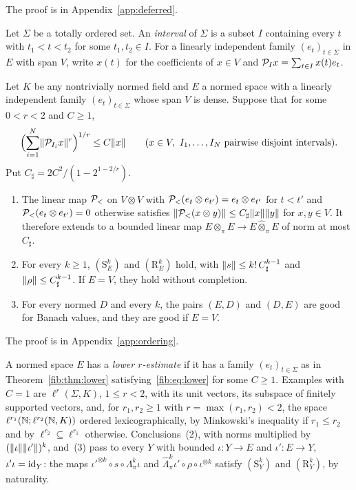 The proof is in Appendix~\ref{app:deferred}.

Let $\Sigma$ be a totally ordered set. An \emph{interval} of $\Sigma$ is a subset $I$ containing every $t$ with
$t_1<t<t_2$ for some $t_1,t_2\in I$. For a linearly independent family $(e_t)_{t\in\Sigma}$ in $E$ with span $V$, write
$x(t)$ for the coefficients of $x\in V$ and $\mathcal P_Ix=\sum_{t\in I}x(t)e_t$.

\begin{theorem}\label{fib:thm:lower}
Let $K$ be any nontrivially normed field and $E$ a normed space with a linearly independent family $(e_t)_{t\in\Sigma}$
whose span $V$ is dense. Suppose that for some $0<r<2$ and $C\ge1$,
\begin{equation}\label{fib:eq:lower}
 \Bigl(\sum_{i=1}^N\lVert \mathcal P_{I_i}x\rVert^r\Bigr)^{1/r}\le C\lVert x\rVert
 \qquad(x\in V,\ I_1,\dots,I_N\text{ pairwise disjoint intervals}).
\end{equation}
Put $C_\sharp=2C^2/(1-2^{1-2/r})$.
\begin{enumerate}
\item The linear map $\mathcal P_<$ on $V\otimes V$ with $\mathcal P_<(e_t\otimes e_{t'})=e_t\otimes e_{t'}$ for $t<t'$ and
$\mathcal P_<(e_t\otimes e_{t'})=0$ otherwise satisfies $\lVert \mathcal P_<(x\otimes y)\rVert\le C_\sharp\lVert x\rVert\lVert y\rVert$ for $x,y\in V$. It
therefore extends to a bounded linear map $E\otimes_\pi E\to E\widehat\otimes_\pi E$ of norm at most $C_\sharp$.
\item For every $k\ge1$, $(\mathrm S^k_E)$ and $(\mathrm R^k_E)$ hold, with $\lVert s\rVert\le k!\,C_\sharp^{k-1}$ and
$\lVert \rho\rVert\le C_\sharp^{k-1}$. If $E=V$, they hold without completion.
\item For every normed $D$ and every $k$, the pairs $(E,D)$ and $(D,E)$ are good for Banach values, and they are good
if $E=V$.
\end{enumerate}
\end{theorem}
The proof is in Appendix~\ref{app:ordering}.

A normed space $E$ has a \emph{lower $r$\nobreakdash-estimate} if it has a family $(e_t)_{t\in\Sigma}$ as in
Theorem~\ref{fib:thm:lower} satisfying~\eqref{fib:eq:lower} for some $C\ge1$. Examples with $C=1$ are $\ell^r(\Sigma,K)$,
$1\le r<2$, with its unit vectors, its subspace of finitely supported vectors, and, for $r_1,r_2\ge1$ with
$r=\max(r_1,r_2)<2$, the space $\ell^{r_1}(\mathbb N;\ell^{r_2}(\mathbb N,K))$ ordered lexicographically, by Minkowski's inequality if
$r_1\le r_2$ and by $\ell^{r_2}\subseteq\ell^{r_1}$ otherwise. Conclusions~(2), with norms multiplied by
$(\lVert \iota\rVert\lVert \iota'\rVert)^k$, and~(3) pass to every $Y$ with bounded $\iota\colon Y\to E$ and $\iota'\colon E\to Y$,
$\iota'\iota=\mathrm{id}_Y$: the maps $\iota'^{\otimes k}\circ s\circ\Lambda^k_\pi\iota$ and
$\widehat\Lambda^k_\pi\iota'\circ\rho\circ\iota^{\otimes k}$ satisfy $(\mathrm S^k_Y)$ and $(\mathrm R^k_Y)$, by naturality.

